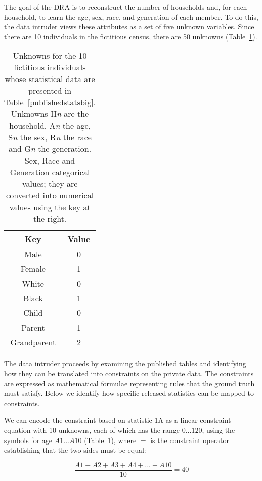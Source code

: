 \documentclass[runningheads]{llncs}
\begin{document}
The goal of the DRA is to reconstruct the number of households and,
for each household, to learn the age, sex, race, and generation of
each member. To do this, the data intruder views these attributes as a set of five
unknown variables. Since there are 10 individuals in
the fictitious census, there are 50 unknowns (Table~\ref{50unknowns}).

\begin{table}
\begin{minipage}[t]{3in}

\end{minipage}
\begin{minipage}[t]{1in}
\begin{tabular}{c|c}
Key & Value \\
\hline
Male & 0 \\
Female & 1 \\
\hline
White & 0 \\
Black & 1 \\
\hline
Child & 0 \\
Parent & 1 \\
Grandparent & 2 \\
\hline
\end{tabular}
\end{minipage}
\caption{Unknowns for the 10 fictitious individuals whose statistical
  data are presented in Table~\ref{publishedstatsbig}. Unknowns
  H\textit{n} are the household, A\textit{n} the age, S\textit{n} the
  sex, R\textit{n} the race and G\textit{n} the generation. Sex, Race
  and Generation categorical values; they are converted into numerical
  values using the key at the right.}\label{50unknowns}
\end{table}

The data intruder proceeds by examining the published tables and
identifying how they can be translated into constraints on the private
data. The constraints are expressed as mathematical formulae
representing rules that the ground truth must satisfy. Below we
identify how specific released statistics can be mapped to
constraints.

We can encode the constraint based on statistic 1A as a linear
constraint equation with 10 unknowns, each of which has the range
$0\ldots120$, using the symbols for age $A1...A10$
(Table~\ref{50unknowns}), where $=$ is the constraint operator
establishing that the two sides must be equal:

\begin{equation}
\frac{A1 + A2 + A3 + A4 +...+ A10}{10} = 40
\end{equation}\label{eq1}
\end{document}
